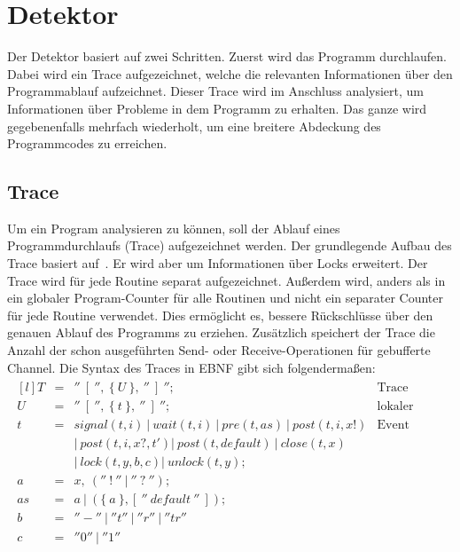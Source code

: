 \section{Detektor}
Der Detektor basiert auf zwei Schritten. Zuerst wird das Programm 
durchlaufen. Dabei wird ein Trace aufgezeichnet, welche die relevanten 
Informationen über den Programmablauf aufzeichnet. Dieser 
Trace wird im Anschluss analysiert, um Informationen über Probleme 
in dem Programm zu erhalten. Das ganze wird gegebenenfalls mehrfach wiederholt,
um eine breitere Abdeckung des Programmcodes zu erreichen.


\subsection{Trace}\label{chap:background-sec:trace}
Um ein Program analysieren zu können, soll der Ablauf eines Programmdurchlaufs
(Trace) aufgezeichnet werden. Der grundlegende Aufbau des Trace basiert auf~\cite{PPDP18}. 
Er wird aber um Informationen 
über Locks erweitert. Der Trace wird für jede Routine
separat aufgezeichnet. Außerdem wird, anders als in~\cite{PPDP18} ein globaler
Program-Counter für alle Routinen und nicht ein separater Counter für jede 
Routine verwendet. Dies ermöglicht es, bessere Rückschlüsse über den genauen 
Ablauf des Programms zu erziehen. Zusätzlich speichert der Trace die Anzahl 
der schon ausgeführten Send- oder Receive-Operationen für gebufferte Channel.
Die Syntax des Traces in EBNF gibt sich 
folgendermaßen:
\begin{align*}
  \begin{matrix*}[l]
    T & = & ''\ [\ '',\ \{\ U\ \},\ ''\ ]\ ''; & \text{Trace}\\
    U & = & ''\ [\ '',\ \{\ t\ \},\ ''\ ]\ ''; & \text{lokaler Trace} \\
    t & = & signal(t, i)\ |\ wait(t, i)\ |\ pre(t, as)\ |\ post(t, i, x!) & \text{Event}\\
      &   & |\ post(t, i, x?, t') |\ post(t, default)\ 
      |\ close(t, x)\  
      & \\
      &   & |\ lock(t, y, b, c) |\ unlock(t, y); & \\
    a & = & x,\ (''\ !\ ''\ |\ ''\ ?\ ''); & \\
    as & = & a\ |\ (\{\ a\ \}, [\ ''\ default\ ''\ ]); & \\
    b & = & ''-''\ |\ ''t''\ |\ ''r''\ |\ ''tr'' & \\
    c & = & ''0''\ |\ ''1''
  \end{matrix*}
\end{align*}
